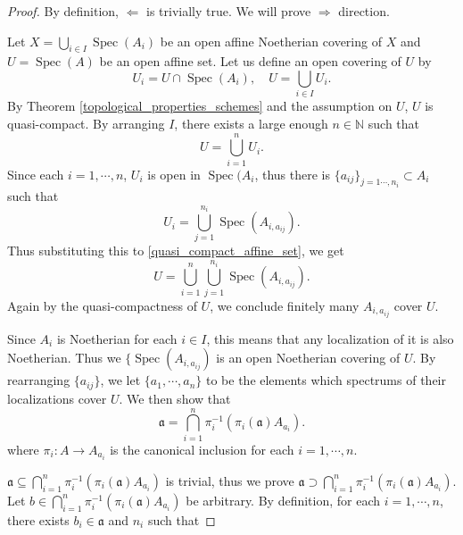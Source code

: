\documentclass{article}
\numberwithin{equation}{section}
\DeclareMathOperator{\Spec}{Spec}
\begin{document}
\begin{proof}By definition, $\Leftarrow$ is trivially true. We will prove $\Rightarrow$ direction.\\
\par Let $X=\bigcup_{i\in I}\Spec(A_i)$ be an open affine Noetherian covering of $X$ and $U=\Spec(A)$ be an open affine set. Let us define an open covering of $U$ by 
\begin{equation*}
U_i=U\cap\Spec(A_i), \quad U=\bigcup_{i\in I}U_i.
\end{equation*}
By Theorem \ref{topological_properties_schemes} and the assumption on $U$, $U$ is quasi-compact. By arranging $I$, there exists a large enough $n\in\mathbb{N}$ such that
\begin{equation*}
U=\bigcup_{i=1}^n U_{i}.
\end{equation*}
Since each $i=1,\cdots,n$, $U_{i}$ is open in $\Spec(A_{i}$, thus there is $\{a_{ij}\}_{j=1\cdots,n_i}\subset A_{i}$ such that 
\begin{equation*}
U_{i} = \bigcup_{j=1}^{n_i}\Spec(A_{i,a_{ij}}).
\end{equation*}
Thus substituting this to \eqref{quasi_compact_affine_set}, we get
\begin{equation*}
U = \bigcup_{i=1}^n \bigcup_{j=1}^{n_i}\Spec(A_{i,a_{ij}}).
\end{equation*}
Again by the quasi-compactness of $U$, we conclude finitely many $A_{i,a_{ij}}$ cover $U$.\\
\par Since $A_i$ is Noetherian for each $i\in I$, this means that any localization of it is also Noetherian. Thus we $\{\Spec(A_{i,a_{ij}})$ is an open Noetherian covering of $U$. By rearranging $\{a_{ij}\}$, we let $\{a_1,\cdots,a_n\}$ to be the elements which spectrums of their localizations cover $U$. We then show that
\begin{equation*}
\mathfrak{a}=\bigcap_{i=1}^n\pi_i^{-1}(\pi_i(\mathfrak{a})A_{a_i}).
\label{contraction_ideal_intersection}
\end{equation*}
where $\pi_i:A\to A_{a_i}$ is the canonical inclusion for each $i=1,\cdots,n$. \\
\par $\mathfrak{a}\subseteq\bigcap_{i=1}^n\pi_i^{-1}(\pi_i(\mathfrak{a})A_{a_i})$ is trivial, thus we prove $\mathfrak{a}\supset\bigcap_{i=1}^n\pi_i^{-1}(\pi_i(\mathfrak{a})A_{a_i})$. Let $b\in\bigcap_{i=1}^n\pi_i^{-1}(\pi_i(\mathfrak{a})A_{a_i})$ be arbitrary. By definition, for each $i=1,\cdots,n$, there exists $b_i\in\mathfrak{a}$ and $n_i$ such that

\end{proof}
\end{document}
